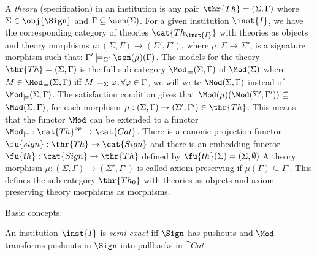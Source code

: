 A {\em theory} (specification) in an institution is any pair
$\thr{Th}=(\Sigma,\Gamma)$ where $\Sigma\in\obj{\Sign}$ and $\Gamma\subseteq
\sen(\Sigma)$. For a given institution $\inst{I}$, we have the corresponding
category of theories $\cat{Th_{\inst{I}}}$ with theories as objects and
theory morphisms $\mu:(\Sigma,\Gamma) \to (\Sigma',\Gamma')$, where
$\mu:\Sigma \to \Sigma'$, is a signature morphism such that: $\Gamma'
\models_{\Sigma'} \sen(\mu)(\Gamma)$.  The models for the theory
$\thr{Th}=(\Sigma,\Gamma)$ is the full sub category
$\Mod_{\models}(\Sigma,\Gamma)$ of $\Mod(\Sigma)$ where $M \in
\Mod_{\models}(\Sigma,\Gamma) \mbox{ iff } M \models_{\Sigma} \varphi,
\forall \varphi \in \Gamma$, we will write $\Mod(\Sigma,\Gamma)$ instead of
$\Mod_{\models}(\Sigma,\Gamma)$.  The satisfaction condition gives that
$\Mod(\mu)(\Mod(\Sigma',\Gamma')) \subseteq$ %
$\Mod(\Sigma,\Gamma)$, for each morphism $\mu:(\Sigma,\Gamma) \to (\Sigma',\Gamma') \in \thr{Th}$. This means that the functor $\Mod$ can be
extended to a functor $\Mod_{\models}:\cat{Th}^{op} \to \cat{Cat}$. There is
a canonic projection functor $\fu{sign}:\thr{Th} \to \cat{Sign}$ and there is
an embedding functor $\fu{th}: \cat{Sign} \to \thr{Th}$ defined by
$\fu{th}(\Sigma)= (\Sigma,\emptyset)$ A theory morphism $\mu:(\Sigma,\Gamma)
\to (\Sigma',\Gamma')$ is called axiom preserving if $\mu(\Gamma) \subseteq
\Gamma'$. This defines the sub category $\thr{Th_0}$ with theories as objects
and axiom preserving theory morphisms as morphisms.

%



Basic concepts:

\begin{definition} An institution $\inst{I}$ is {\em semi exact} iff $\Sign$ has pushouts and $\Mod$ transforms pushouts in $\Sign$ into pullbacks in $\cat{Cat}$
\end{definition}

